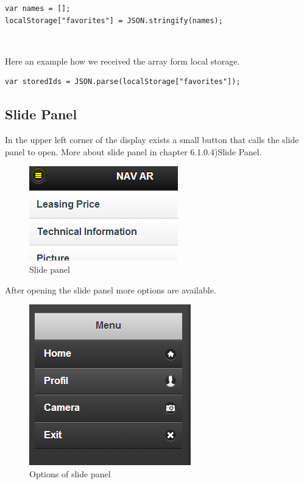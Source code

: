 \begin{lstlisting}[language=html, caption= 
array into local storage,captionpos=b]
var names = [];
localStorage["favorites"] = JSON.stringify(names);
\end{lstlisting}
\
\

Here an example how we received the array form local storage.
\\
\begin{lstlisting}[language=html, caption= 
start timer function,captionpos=b]
var storedIds = JSON.parse(localStorage["favorites"]);
\end{lstlisting}

\newpage
\subsection{Slide Panel}
In the upper left corner of the display exists a small button that calls the slide panel to open. More about slide panel in chapter 6.1.0.4)Slide Panel.
\\

\begin{figure}[h]
\centering
\includegraphics[width=0.5\linewidth]{graphics/chapter4/13}
\caption{Slide panel}
\end{figure}
After opening the slide panel more options are available. 


\begin{figure}[h]
\centering
\includegraphics[width=0.5\linewidth]{graphics/chapter4/14}
\caption{Options of slide panel}
\end{figure}

